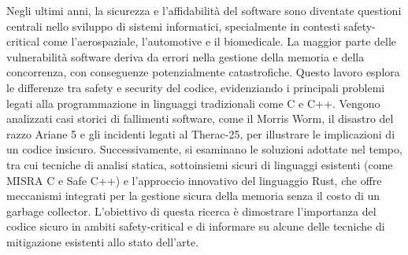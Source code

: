 Negli ultimi anni, la sicurezza e l'affidabilità del software sono diventate questioni centrali nello sviluppo di sistemi informatici, specialmente in contesti safety-critical come l'aerospaziale, l'automotive e il biomedicale. La maggior parte delle vulnerabilità software deriva da errori nella gestione della memoria e della concorrenza, con conseguenze potenzialmente catastrofiche. Questo lavoro esplora le differenze tra safety e security del codice, evidenziando i principali problemi legati alla programmazione in linguaggi tradizionali come C e C++. Vengono analizzati casi storici di fallimenti software, come il Morris Worm, il disastro del razzo Ariane 5 e gli incidenti legati al Therac-25, per illustrare le implicazioni di un codice insicuro. Successivamente, si esaminano le soluzioni adottate nel tempo, tra cui tecniche di analisi statica, sottoinsiemi sicuri di linguaggi esistenti (come MISRA C e Safe C++) e l'approccio innovativo del linguaggio Rust, che offre meccanismi integrati per la gestione sicura della memoria senza il costo di un garbage collector. L'obiettivo di questa ricerca è dimostrare l'importanza del codice sicuro in ambiti safety-critical e di informare su alcune delle tecniche di mitigazione esistenti allo stato dell'arte.
